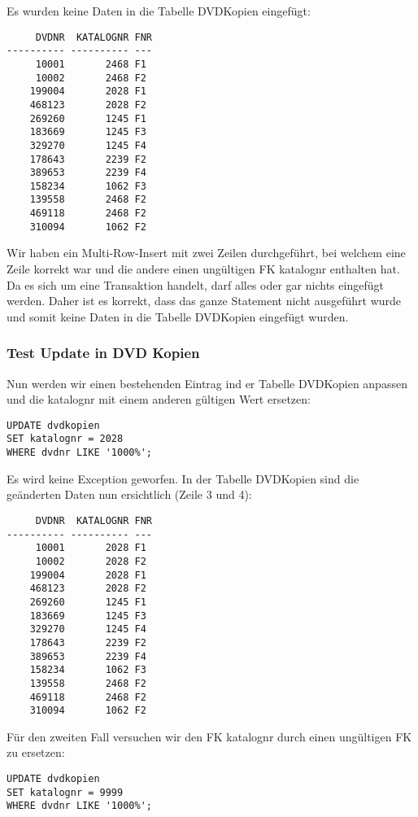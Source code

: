 \documentclass[11pt,a4paper,parskip=half]{scrartcl}
\begin{document}
Es wurden keine Daten in die Tabelle DVDKopien eingefügt:

\begin{lstlisting}
     DVDNR  KATALOGNR FNR
---------- ---------- ---
     10001       2468 F1  
     10002       2468 F2
    199004       2028 F1  
    468123       2028 F2  
    269260       1245 F1  
    183669       1245 F3  
    329270       1245 F4  
    178643       2239 F2  
    389653       2239 F4  
    158234       1062 F3  
    139558       2468 F2  
    469118       2468 F2  
    310094       1062 F2  
\end{lstlisting}

Wir haben ein Multi-Row-Insert mit zwei Zeilen durchgeführt, bei welchem eine Zeile korrekt war und die andere einen ungültigen FK katalognr enthalten hat. Da es sich um eine Transaktion handelt, darf alles oder gar nichts eingefügt werden. Daher ist es korrekt, dass das ganze Statement nicht ausgeführt wurde und somit keine Daten in die Tabelle DVDKopien eingefügt wurden.

\subsubsection{Test Update in DVD Kopien}
Nun werden wir einen bestehenden Eintrag ind er Tabelle DVDKopien anpassen und die katalognr mit einem anderen gültigen Wert ersetzen:

\begin{lstlisting}
UPDATE dvdkopien
SET katalognr = 2028
WHERE dvdnr LIKE '1000%';
\end{lstlisting}

Es wird keine Exception geworfen. In der Tabelle DVDKopien sind die geänderten Daten nun ersichtlich (Zeile 3 und 4):

\begin{lstlisting}
     DVDNR  KATALOGNR FNR
---------- ---------- ---
     10001       2028 F1  
     10002       2028 F2  
    199004       2028 F1  
    468123       2028 F2  
    269260       1245 F1  
    183669       1245 F3  
    329270       1245 F4  
    178643       2239 F2  
    389653       2239 F4  
    158234       1062 F3  
    139558       2468 F2  
    469118       2468 F2  
    310094       1062 F2  
\end{lstlisting}

Für den zweiten Fall versuchen wir den FK katalognr durch einen ungültigen FK zu ersetzen:

\begin{lstlisting}
UPDATE dvdkopien
SET katalognr = 9999
WHERE dvdnr LIKE '1000%';
\end{lstlisting}
\end{document}

